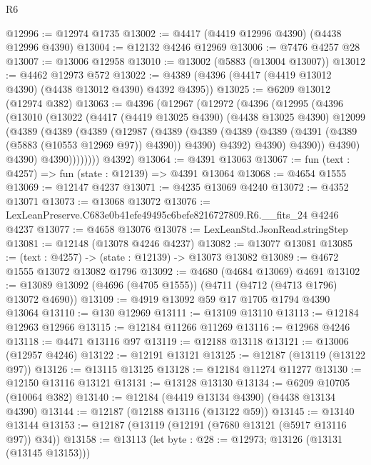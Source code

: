 \begin{lexlean}{R6}
\begin{coremodule}
@12996 := @12974 @1735
@13002 := @4417 (@4419 @12996 @4390) (@4438 @12996 @4390)
@13004 := @12132 @4246 @12969
@13006 := @7476 @4257 @28
@13007 := @13006 @12958
@13010 := @13002 (@5883 (@13004 @13007))
@13012 := @4462 @12973 @572
@13022 := @4389 (@4396 (@4417 (@4419 @13012 @4390) (@4438 @13012 @4390) @4392 @4395))
@13025 := @6209 @13012 (@12974 @382)
@13063 := @4396
    (@12967
      (@12972
        (@4396
          (@12995
            (@4396
              (@13010
                (@13022
                  (@4417
                    (@4419 @13025 @4390)
                    (@4438 @13025 @4390)
                    @12099
                    (@4389
                      (@4389
                        (@4389
                          (@12987
                            (@4389
                              (@4389
                                (@4389
                                  (@4389 (@4391 (@4389 (@5883 (@10553 @12969 @97)) @4390)) @4390)
                                  @4392)
                                @4390)
                              @4390))
                          @4390)
                        @4390)
                      @4390))))))))
      @4392)
@13064 := @4391 @13063
@13067 := fun (text : @4257) => fun (state : @12139) => @4391 @13064
@13068 := @4654 @1555
@13069 := @12147 @4237
@13071 := @4235 @13069 @4240
@13072 := @4352 @13071
@13073 := @13068 @13072
@13076 := LexLeanPreserve.C683e0b41efe49495c6befe8216727809.R6.__fits_24 @4246 @4237
@13077 := @4658 @13076
@13078 := LexLeanStd.JsonRead.stringStep
@13081 := @12148 (@13078 @4246 @4237)
@13082 := @13077 @13081
@13085 := (text : @4257) -> (state : @12139) -> @13073 @13082
@13089 := @4672 @1555 @13072 @13082 @1796
@13092 := @4680 (@4684 @13069) @4691
@13102 := @13089 @13092 (@4696 (@4705 @1555)) (@4711 (@4712 (@4713 @1796) @13072 @4690))
@13109 := @4919 @13092 @59 @17 @1705 @1794 @4390 @13064
@13110 := @130 @12969
@13111 := @13109 @13110
@13113 := @12184 @12963 @12966
@13115 := @12184 @11266 @11269
@13116 := @12968 @4246
@13118 := @4471 @13116 @97
@13119 := @12188 @13118
@13121 := @13006 (@12957 @4246)
@13122 := @12191 @13121
@13125 := @12187 (@13119 (@13122 @97))
@13126 := @13115 @13125
@13128 := @12184 @11274 @11277
@13130 := @12150 @13116 @13121
@13131 := @13128 @13130
@13134 := @6209 @10705 (@10064 @382)
@13140 := @12184 (@4419 @13134 @4390) (@4438 @13134 @4390)
@13144 := @12187 (@12188 @13116 (@13122 @59))
@13145 := @13140 @13144
@13153 := @12187 (@13119 (@12191 (@7680 @13121 (@5917 @13116 @97)) @34))
@13158 := @13113 (let byte : @28 := @12973; @13126 (@13131 (@13145 @13153)))

\end{coremodule}
\end{lexlean}
